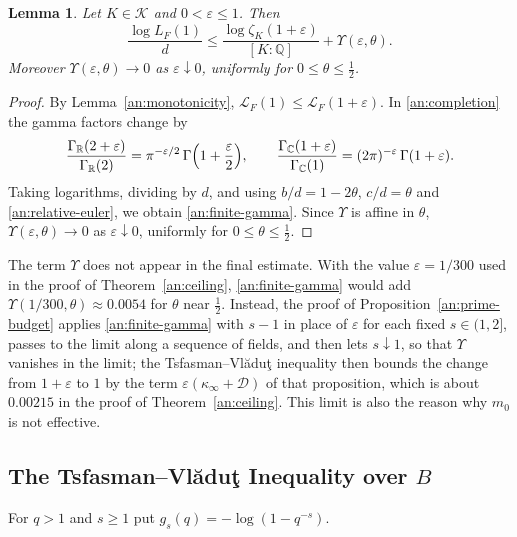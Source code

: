 \documentclass[11pt]{amsart}
\numberwithin{equation}{section}
\newtheorem{lemma}[equation]{Lemma}
\theoremstyle{definition}
\theoremstyle{remark}
\newcommand{\Q}{\mathbb Q}
\newcommand{\R}{\mathbb R}
\newcommand{\C}{\mathbb C}
\begin{document}
\begin{lemma}\label{an:shift}
Let $K\in\mathcal K$ and $0<\varepsilon\le1$. Then
\begin{equation}\label{an:finite-gamma}
 \frac{\log L_F(1)}d
 \le\frac{\log\zeta_K(1+\varepsilon)}{[K:\Q]}+\Upsilon(\varepsilon,\theta).
\end{equation}
Moreover $\Upsilon(\varepsilon,\theta)\to0$ as $\varepsilon\downarrow0$,
uniformly for $0\le\theta\le\frac12$.
\end{lemma}

\begin{proof}
By Lemma~\ref{an:monotonicity},
$\mathcal L_F(1)\le\mathcal L_F(1+\varepsilon)$. In \eqref{an:completion}
the gamma factors change by
\[
 \frac{\Gamma_\R(2+\varepsilon)}{\Gamma_\R(2)}
 =\pi^{-\varepsilon/2}\,\Gamma\Bigl(1+\frac\varepsilon2\Bigr),\qquad
 \frac{\Gamma_\C(1+\varepsilon)}{\Gamma_\C(1)}
 =(2\pi)^{-\varepsilon}\,\Gamma(1+\varepsilon).
\]
Taking logarithms, dividing by $d$, and using $b/d=1-2\theta$, $c/d=\theta$
and \eqref{an:relative-euler}, we obtain \eqref{an:finite-gamma}. Since
$\Upsilon$ is affine in $\theta$, $\Upsilon(\varepsilon,\theta)\to0$ as
$\varepsilon\downarrow0$, uniformly for $0\le\theta\le\frac12$.
\end{proof}

The term $\Upsilon$ does not appear in the final estimate. With the value
$\varepsilon=1/300$ used in the proof of Theorem~\ref{an:ceiling},
\eqref{an:finite-gamma} would add $\Upsilon(1/300,\theta)\approx0.0054$ for
$\theta$ near $\frac12$. Instead, the proof of
Proposition~\ref{an:prime-budget} applies \eqref{an:finite-gamma} with
$s-1$ in place of $\varepsilon$ for each fixed $s\in(1,2]$, passes to the
limit along a sequence of fields, and then lets $s\downarrow1$, so that
$\Upsilon$ vanishes in the limit; the
Tsfasman--Vl\u{a}du\c{t} inequality then bounds the change from
$1+\varepsilon$ to $1$ by the term $\varepsilon(\kappa_\infty+\mathcal D)$
of that proposition, which is about $0.00215$ in the proof of
Theorem~\ref{an:ceiling}. This limit is also the reason why $m_0$ is not
effective.

\subsection{\texorpdfstring{The Tsfasman--Vl\u{a}du\c{t} Inequality over $B$}{The Tsfasman-Vladut Inequality over B}}
\label{an:budget-section}
For $q>1$ and $s\ge1$ put $g_s(q)=-\log(1-q^{-s})$.
\end{document}
